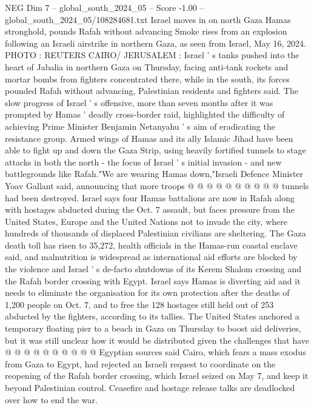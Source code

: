 \begin{textsample}{NEG Dim 7 – global\_south\_2024\_05 – Score -1.00 – global\_south\_2024\_05/108284681.txt}  \label{ex:f7_neg_240}
Israel moves in on north Gaza Hamas stronghold, pounds Rafah without advancing Smoke rises from an explosion following an Israeli airstrike in northern Gaza, as seen from Israel, May 16, 2024.
PHOTO : REUTERS CAIRO/ JERUSALEM : Israel ' s tanks pushed into the heart of Jabalia in northern Gaza on Thursday, facing anti-tank rockets and mortar bombs from fighters concentrated there, while in the south, its forces pounded Rafah without advancing, Palestinian residents and fighters said.
The slow progress of Israel ' s offensive, more than seven months after it was prompted by Hamas ' deadly cross-border raid, highlighted the difficulty of achieving Prime Minister Benjamin Netanyahu ' s aim of eradicating the resistance group.
Armed wings of Hamas and its ally Islamic Jihad have been able to fight up and down the Gaza Strip, using heavily fortified tunnels to stage attacks in both the north - the focus of Israel ' s initial invasion - and new battlegrounds like Rafah."We are wearing Hamas down,"Israeli Defence Minister Yoav Gallant said, announcing that more troops @ @ @ @ @ @ @ @ @ @ tunnels had been destroyed.
Israel says four Hamas battalions are now in Rafah along with hostages abducted during the Oct. 7 assault, but faces pressure from the United States, Europe and the United Nations not to invade the city, where hundreds of thousands of displaced Palestinian civilians are sheltering.
The Gaza death toll has risen to 35,272, health officials in the Hamas-run coastal enclave said, and malnutrition is widespread as international aid efforts are blocked by the violence and Israel ' s de-facto shutdowns of its Kerem Shalom crossing and the Rafah border crossing with Egypt.
Israel says Hamas is diverting aid and it needs to eliminate the organisation for its own protection after the deaths of 1,200 people on Oct. 7, and to free the 128 hostages still held out of 253 abducted by the fighters, according to its tallies.
The United States anchored a temporary floating pier to a beach in Gaza on Thursday to boost aid deliveries, but it was still unclear how it would be distributed given the challenges that have @ @ @ @ @ @ @ @ @ @ Egyptian sources said Cairo, which fears a mass exodus from Gaza to Egypt, had rejected an Israeli request to coordinate on the reopening of the Rafah border crossing, which Israel seized on May 7, and keep it beyond Palestinian control.
Ceasefire and hostage release talks are deadlocked over how to end the war.

\end{textsample}
